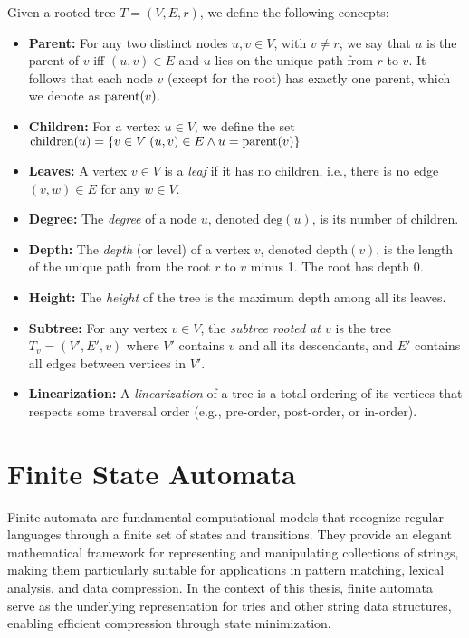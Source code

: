 \begin{definition} \label{def:tree_terminology}
Given a rooted tree $T = (V, E, r)$, we define the following concepts:
\begin{itemize}
    \item \textbf{Parent:} For any two distinct nodes $u,v\in V$, with $v\neq r$, we say that $u$ is the parent of $v$ iff $(u, v) \in E$ and $u$ lies on the unique path from $r$ to $v$. It follows that each node $v$ (except for the root) has exactly one parent, which we denote as $\textup{parent}(v)$. 
    \item \textbf{Children:} For a vertex $u\in V$, we define the set $\textup{children}(u) = \{v \in V | (u,v)\in E \land u = \textup{parent}(v)\}$
    \item \textbf{Leaves:} A vertex $v \in V$ is a \textit{leaf} if it has no children, i.e., there is no edge $(v, w) \in E$ for any $w \in V$.
    \item \textbf{Degree:} The \textit{degree} of a node $u$, denoted $\text{deg}(u)$, is its number of children.
    \item \textbf{Depth:} The \textit{depth} (or level) of a vertex $v$, denoted $\text{depth}(v)$, is the length of the unique path from the root $r$ to $v$ minus 1. The root has depth 0.
    \item \textbf{Height:} The \textit{height} of the tree is the maximum depth among all its leaves.
    \item \textbf{Subtree:} For any vertex $v \in V$, the \textit{subtree rooted at $v$} is the tree $T_v = (V', E', v)$ where $V'$ contains $v$ and all its descendants, and $E'$ contains all edges between vertices in $V'$.
    \item \textbf{Linearization:} A \textit{linearization} of a tree is a total ordering of its vertices that respects some traversal order (e.g., pre-order, post-order, or in-order).
\end{itemize}
\end{definition}


\section{Finite State Automata} \label{sed:fsa}
Finite automata are fundamental computational models that recognize regular languages through a finite set of states and transitions. They provide an elegant mathematical framework for representing and manipulating collections of strings, making them particularly suitable for applications in pattern matching, lexical analysis, and data compression. In the context of this thesis, finite automata serve as the underlying representation for tries and other string data structures, enabling efficient compression through state minimization.

